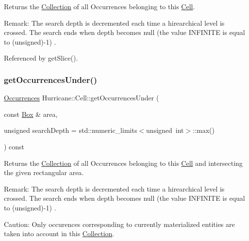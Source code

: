Returns the \hyperlink{classHurricane_1_1Collection}{Collection} of all Occurrences belonging to this \hyperlink{classHurricane_1_1Cell}{Cell}.

\begin{DoxyParagraph}{Remark\+:}
The search depth is decremented each time a hirearchical level is crossed. The search ends when depth becomes null (the value {\ttfamily I\+N\+F\+I\+N\+I\+TE} is equal to {\ttfamily }(unsigned)-\/1) . 
\end{DoxyParagraph}


Referenced by get\+Slice().

\mbox{\label{classHurricane_1_1Cell_a7fb09c8e350923c47ce4c4407bdb00ce}} 
\subsubsection{\texorpdfstring{get\+Occurrences\+Under()}{getOccurrencesUnder()}}
{\footnotesize\ttfamily \hyperlink{namespaceHurricane_a1912927c128eee859af62dbe4cbe0a6b}{Occurrences} Hurricane\+::\+Cell\+::get\+Occurrences\+Under (\begin{DoxyParamCaption}\item[{const \hyperlink{classHurricane_1_1Box}{Box} \&}]{area,  }\item[{unsigned}]{search\+Depth = {\ttfamily std\+:\+:numeric\+\_\+limits$<$unsigned~int$>$\+:\+:max()} }\end{DoxyParamCaption}) const}

Returns the \hyperlink{classHurricane_1_1Collection}{Collection} of all Occurrences belonging to this \hyperlink{classHurricane_1_1Cell}{Cell} and intersecting the given rectangular area.

\begin{DoxyParagraph}{Remark\+:}
The search depth is decremented each time a hirearchical level is crossed. The search ends when depth becomes null (the value {\ttfamily I\+N\+F\+I\+N\+I\+TE} is equal to {\ttfamily }(unsigned)-\/1) .
\end{DoxyParagraph}
\begin{DoxyParagraph}{Caution\+:}
Only occurences corresponding to currently materialized entities are taken into account in this \hyperlink{classHurricane_1_1Collection}{Collection}. 
\end{DoxyParagraph}


